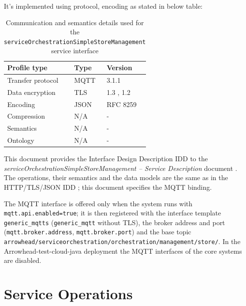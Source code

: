 \documentclass[a4paper]{arrowhead}
\begin{document}
It's implemented using protocol, encoding as stated in below table:
\begin{table}[ht!]
  \centering
  \begin{tabular}{|l|l|l|}
    \hline
    \rowcolor{gray!33} Profile type & Type & Version \\ \hline
    Transfer protocol & MQTT & 3.1.1 \cite{mqtt311} \\ \hline
    Data encryption & TLS & 1.3 \cite{rfc8446}, 1.2 \cite{rfc5246} \\ \hline
    Encoding & JSON & RFC 8259 \cite{rfc8259} \\ \hline
    Compression & N/A & - \\ \hline
    Semantics & N/A & - \\ \hline
    Ontology & N/A & - \\ \hline
  \end{tabular}
  \caption{Communication and semantics details used for the \texttt{service\allowbreak{}Orchestration\allowbreak{}Simple\allowbreak{}Store\allowbreak{}Management} service interface}
  \label{tab:comunication_semantics_profile}
\end{table}

This document provides the Interface Design Description IDD to the \textit{serviceOrchestrationSimpleStoreManagement -- Service Description} document \cite{ssso-serviceOrchestrationSimpleStoreManagement-sd}.
The operations, their semantics and the data models are the same as in the HTTP/TLS/JSON IDD \cite{ssso-serviceOrchestrationSimpleStoreManagement-http-idd}; this document specifies the MQTT binding.

The MQTT interface is offered only when the system runs with \texttt{mqtt.api.enabled=true}; it is then registered with the interface template \texttt{generic\_\allowbreak{}mqtts} (\texttt{generic\_\allowbreak{}mqtt} without TLS), the broker address and port (\texttt{mqtt.\allowbreak{}broker.\allowbreak{}address}, \texttt{mqtt.\allowbreak{}broker.\allowbreak{}port}) and the base topic \texttt{arrowhead/\allowbreak{}serviceorchestration/\allowbreak{}orchestration/\allowbreak{}management/\allowbreak{}store/\allowbreak{}}. In the Arrowhead-test-cloud-java deployment the MQTT interfaces of the core systems are disabled.

\newpage

\section{Service Operations}
\label{sec:operations}
\end{document}
